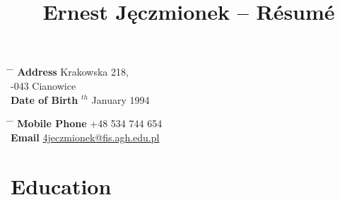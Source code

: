 \documentclass[10pt]{article} %
\begin{document}

\title{Ernest Jęczmionek -- Résumé} %


\parbox{0.5\textwidth}{ %
\begin{tabbing} %
\hspace{3cm} \= \hspace{4cm} \= \kill %
{\bf Address} \> Krakowska 218,\\ %
-043 Cianowice \\ %
{\bf Date of Birth} $^{th}$ January 1994 \\ %
\end{tabbing}}
\hfill %
\parbox{0.5\textwidth}{ %
\begin{tabbing} %
\hspace{3cm} \= \hspace{4cm} \= \kill %
{\bf Mobile Phone} \> +48 534 744 654 \\ %
{\bf Email} \> \href{mailto:4jeczmionek@fis.agh.edu.pl}{4jeczmionek@fis.agh.edu.pl} \\ %
\end{tabbing}}


\section{Education}

\end{document}
